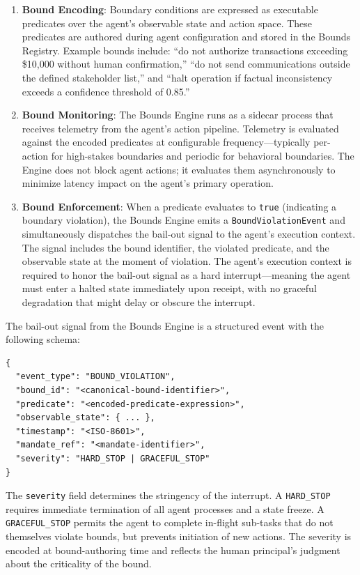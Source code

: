 \begin{enumerate}
  \item \textbf{Bound Encoding}: Boundary conditions are expressed as executable predicates over the agent's observable state and action space. These predicates are authored during agent configuration and stored in the Bounds Registry. Example bounds include: ``do not authorize transactions exceeding \$10,000 without human confirmation,'' ``do not send communications outside the defined stakeholder list,'' and ``halt operation if factual inconsistency exceeds a confidence threshold of 0.85.''

  \item \textbf{Bound Monitoring}: The Bounds Engine runs as a sidecar process that receives telemetry from the agent's action pipeline. Telemetry is evaluated against the encoded predicates at configurable frequency—typically per-action for high-stakes boundaries and periodic for behavioral boundaries. The Engine does not block agent actions; it evaluates them asynchronously to minimize latency impact on the agent's primary operation.

  \item \textbf{Bound Enforcement}: When a predicate evaluates to \texttt{true} (indicating a boundary violation), the Bounds Engine emits a \texttt{BoundViolationEvent} and simultaneously dispatches the bail-out signal to the agent's execution context. The signal includes the bound identifier, the violated predicate, and the observable state at the moment of violation. The agent's execution context is required to honor the bail-out signal as a hard interrupt—meaning the agent must enter a halted state immediately upon receipt, with no graceful degradation that might delay or obscure the interrupt.
\end{enumerate}

The bail-out signal from the Bounds Engine is a structured event with the following schema:

\begin{verbatim}
{
  "event_type": "BOUND_VIOLATION",
  "bound_id": "<canonical-bound-identifier>",
  "predicate": "<encoded-predicate-expression>",
  "observable_state": { ... },
  "timestamp": "<ISO-8601>",
  "mandate_ref": "<mandate-identifier>",
  "severity": "HARD_STOP | GRACEFUL_STOP"
}
\end{verbatim}

The \texttt{severity} field determines the stringency of the interrupt. A \texttt{HARD\_STOP} requires immediate termination of all agent processes and a state freeze. A \texttt{GRACEFUL\_STOP} permits the agent to complete in-flight sub-tasks that do not themselves violate bounds, but prevents initiation of new actions. The severity is encoded at bound-authoring time and reflects the human principal's judgment about the criticality of the bound.

